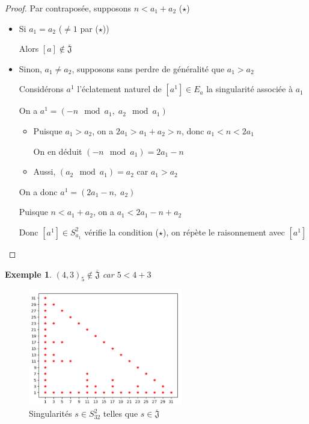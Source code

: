 \documentclass{article}
\newtheorem{example}{Exemple}
\newcommand{\J}{\mathfrak{J}}
\newcommand{\JS}{\overline{\J}}
\begin{document}
\begin{proof}
    Par contraposée, supposons $n < a_1 + a_2$ ($\star$)

    \begin{itemize}
        \item Si $a_1 = a_2$ ($\neq 1$ par ($\star$))

            Alors $[a] \not \in \JS$
        \item Sinon, $a_1 \neq a_2$, supposons sans perdre de généralité que $a_1 > a_2$

            Considérons $a^1$ l'éclatement naturel de $[a^1] \in E_a$ la singularité associée à $a_1$

            On a $a^1 = (-n \mod a_1,\; a_2 \mod a_1)$

            \begin{itemize}
                \item Puisque $a_1 > a_2$, on a $2a_1 > a_1 + a_2 > n$, donc $a_1 < n < 2a_1$
                    
                On en déduit $(-n \mod a_1) = 2a_1 - n$

                \item Aussi, $(a_2 \mod a_1) = a_2$ car $a_1 > a_2$
            \end{itemize}

            On a donc $a^1 = (2a_1-n,\; a_2)$

            Puisque $n < a_1 + a_2$, on a $a_1 < 2a_1 - n + a_2$

            Donc $[a^1] \in S_{a_1}^2$ vérifie la condition ($\star$), on répète le raisonnement avec $[a^1]$
    \end{itemize}
\end{proof}

\begin{example}
    ${(4, 3)}_5 \not \in \JS$ car $5 < 4 + 3$
\end{example}

\begin{figure}[h]
    \caption{Singularités $s \in S_{32}^2$ telles que $s \in \JS$}
    \centering
    \includegraphics[width=0.6\textwidth]{singularite_j_strict_m2_n32}
\end{figure}
\end{document}
